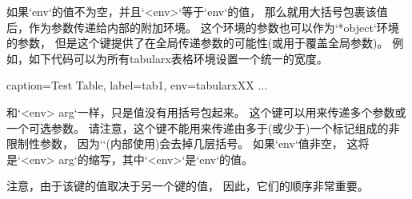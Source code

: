   如果`env`的值不为空，并且`<env>`等于`env`的值，
  那么就用大括号包裹该值后，作为参数传递给内部的附加环境。
  这个环境的参数也可以作为`*object`环境的参数，
  但是这个键提供了在全局传递参数的可能性(或用于覆盖全局参数)。
  例如，如下代码可以为所有tabularx表格环境设置一个统一的宽度。

  \begin{examplecode}

  \begin{tableobject}{caption=Test Table, label=tab1, env=tabularx}{XX}
      ...
  \end{tableobject}
  \end{examplecode}

  和`<env> arg`一样，只是值没有用括号包起来。
  这个键可以用来传递多个参数或一个可选参数。
  请注意，这个键不能用来传递由多于(或少于)一个标记组成的非限制性参数，
  因为`\pgfkeys`(内部使用)会去掉几层括号。
  如果`env`值非空，
  这将是`<env> arg`的缩写，其中`<env>`是`env`的值。

  注意，由于该键的值取决于另一个键的值，
  因此，它们的顺序非常重要。

